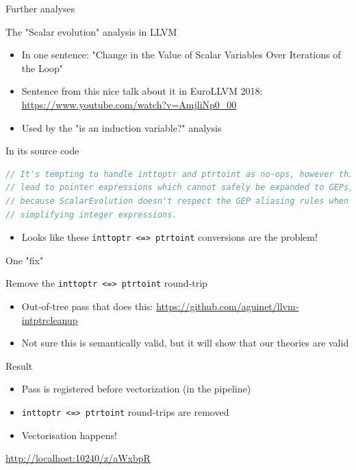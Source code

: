 \begin{frame}[fragile]{Further analyses}
  \begin{block}{The "Scalar evolution" analysis in LLVM}
    \begin{itemize}
      \item In one sentence: "Change in the Value of Scalar Variables Over Iterations of the Loop"
      \item Sentence from this nice talk about it in EuroLLVM 2018: \url{https://www.youtube.com/watch?v=AmjliNp0_00}
      \item Used by the "is an induction variable?" analysis
    \end{itemize}
  \end{block}

  \pause

  \begin{alertblock}{In its source code}
    \begin{lstlisting}[language=c]
// It's tempting to handle inttoptr and ptrtoint as no-ops, however this can
// lead to pointer expressions which cannot safely be expanded to GEPs,
// because ScalarEvolution doesn't respect the GEP aliasing rules when
// simplifying integer expressions.
    \end{lstlisting}

    \begin{itemize}
      \item Looks like these {\tt inttoptr <=> ptrtoint} conversions are the problem!
    \end{itemize}
  \end{alertblock}
\end{frame}

\begin{frame}{One "fix"}
  \begin{block}{Remove the {\tt inttoptr <=> ptrtoint} round-trip}
    \begin{itemize}
      \item Out-of-tree pass that does this: \url{https://github.com/aguinet/llvm-intptrcleanup}
      \item Not sure this is semantically valid, but it will show that our theories are valid
    \end{itemize}
  \end{block}

  \pause

  \begin{alertblock}{Result}
    \begin{itemize}
      \item Pass is registered before vectorization (in the pipeline)
      \item {\tt inttoptr <=> ptrtoint} round-trips are removed
      \item Vectorisation happens!
    \end{itemize}
    \begin{center}
      \url{http://localhost:10240/z/aWxbpR}
    \end{center}
  \end{alertblock}
\end{frame}

